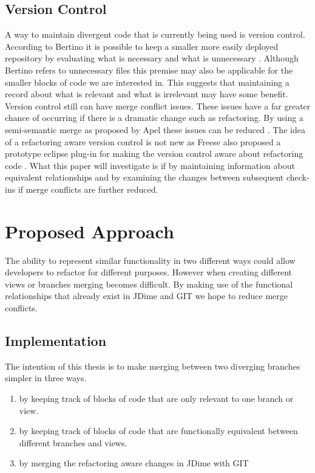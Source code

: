 \documentclass[12pt]{CRPITStyle}
\renewcommand{\cite}{\citep}
\begin{document}
\subsection{Version Control} 
A way to maintain divergent code that is currently being used is version control. According to Bertino it is possible to keep a smaller more easily deployed repository by evaluating what is necessary and what is unnecessary \cite{Bertino2012}. Although Bertino refers to unnecessary files this premise may also be applicable for the smaller blocks of code we are interested in. This suggests that maintaining a record about what is relevant and what is irrelevant may have some benefit. Version control still can have merge conflict issues. These issues have a far greater chance of occurring if there is a dramatic change such as refactoring. By using a semi-semantic merge as proposed by Apel these issues can be reduced \cite{Apel2011}. The idea of a refactoring aware version control is not new as Freese also proposed a prototype eclipse plug-in for making the version control aware about refactoring code \cite{Freese2006}. What this paper will investigate is if by maintaining information about equivalent relationships and by examining the changes between subsequent check-ins if merge conflicts are further reduced. 
\section{Proposed Approach}
The ability to represent similar functionality in two different ways could allow developers to refactor for different purposes. However when creating different views or branches merging becomes difficult. By making use of the functional relationships that already exist in JDime and GIT we hope to reduce merge conflicts.  

\subsection{Implementation}

The intention of this thesis is to make merging between two diverging branches simpler in three ways. 

\begin{enumerate}

 \item by keeping track of blocks of code that are only relevant to one branch or view.
 \item by keeping track of blocks of code that are functionally equivalent between different branches and views.
 \item by merging the refactoring aware changes in JDime with GIT

\end{enumerate}
\end{document}
